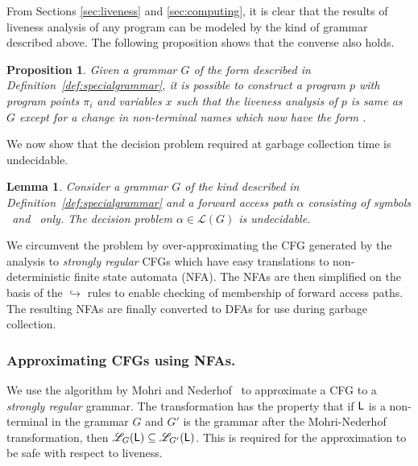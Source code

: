 \documentclass[9pt]{sigplanconf}
\newcommand{\comment}[1]{{\color{Myblue}{(#1)}}}
\newtheorem{proposition}[theorem]{Proposition}
\newtheorem{lemma}[theorem]{Lemma}
\begin{document}
From Sections \ref{sec:liveness}  and \ref{sec:computing}, it is clear
that the results of liveness analysis of any program can be modeled by
the kind  of grammar described above. The  following proposition shows
that the converse also holds.
\begin{proposition}
Given    a     grammar    $G$    of    the     form    described    in
Definition~\ref{def:specialgrammar},  it is  possible  to construct  a
program $p$  with program points  $\pi_i$ and variables $x$  such that
the liveness  analysis of $p$  is same as  $G$ except for a  change in
non-terminal names which now have the form .
\end{proposition}
We now show that the decision problem required at garbage collection
time is undecidable. 

\begin{lemma}
Consider a grammar $G$ of the kind  described in
Definition~\ref{def:specialgrammar} and a forward access path $\alpha$ consisting
of symbols \acar\ and \acdr\  only. The decision problem $\alpha \in
\mathscr{L}(G)$ is undecidable.  
\end{lemma}

\comment{Proof:}


  We circumvent the problem by over-approximating the CFG generated by
  the  analysis  to  {\em  strongly  regular}  CFGs  which  have  easy
  translations to  non-deterministic finite state  automata (NFA). The
  NFAs are then simplified on the basis of the $\hookrightarrow$ rules
  to  enable  checking of  membership  of  forward  access paths.  The
  resulting NFAs are finally converted  to DFAs for use during garbage
  collection.  \comment{Fix all comments and produce first draft}
\subsubsection{Approximating CFGs using NFAs.}
\label{sec:NFA-approx}
\comment{Change the language and the example}
We use the
algorithm  by  Mohri  and Nederhof~\cite{mohri00regular}   to
approximate a CFG  to a   {\em strongly regular\/} grammar.  The
transformation has  the  property that  if $\mathsf{L}$  is a
non-terminal  in the grammar  $G$ and  $G'$ is  the grammar  after the
Mohri-Nederhof transformation, then  ${\mathscr L}_G(\mathsf{L}) \subseteq
{\mathscr
  L}_{G'}(\mathsf{L})$.    This  is   required  for the
approximation to be safe with respect to liveness.
\end{document}
